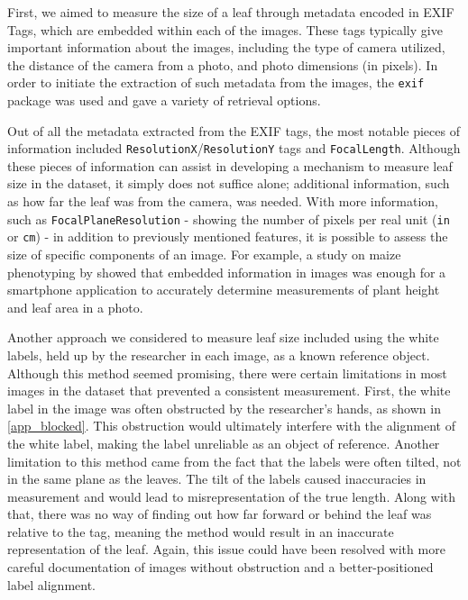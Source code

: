 \documentclass[final,5p,times,twocolumn,authoryear]{elsarticle}
\begin{document}
First, we aimed to measure the size of a leaf through metadata encoded in EXIF Tags, which are embedded within each of the images. These tags typically give important information about the images, including the type of camera utilized, the distance of the camera from a photo, and photo dimensions (in pixels). In order to initiate the extraction of such metadata from the images, the \verb|exif| package was used and gave a variety of retrieval options. 

Out of all the metadata extracted from the EXIF tags, the most notable pieces of information included \verb|ResolutionX|/\verb|ResolutionY| tags and \verb|FocalLength|. Although these pieces of information can assist in developing a mechanism to measure leaf size in the dataset, it simply does not suffice alone; additional information, such as how far the leaf was from the camera, was needed. With more information, such as \verb|FocalPlaneResolution| - showing the number of pixels per real unit (\verb|in| or \verb|cm|) - in addition to previously mentioned features, it is possible to assess the size of specific components of an image. For example, a study on maize phenotyping by \cite{liu2021pocketmaize} showed that embedded information in images was enough for a smartphone application to accurately determine measurements of plant height and leaf area in a photo.

Another approach we considered to measure leaf size included using the white labels, held up by the researcher in each image, as a known reference object. Although this method seemed promising, there were certain limitations in most images in the dataset that prevented a consistent measurement. First, the white label in the image was often obstructed by the researcher’s hands, as shown in \ref{app_blocked}. This obstruction would ultimately interfere with the alignment of the white label, making the label unreliable as an object of reference. Another limitation to this method came from the fact that the labels were often tilted, not in the same plane as the leaves. The tilt of the labels caused inaccuracies in measurement and would lead to misrepresentation of the true length. Along with that, there was no way of finding out how far forward or behind the leaf was relative to the tag, meaning the method would result in an inaccurate representation of the leaf. Again, this issue could have been resolved with more careful documentation of images without obstruction and a better-positioned label alignment.
\end{document}
